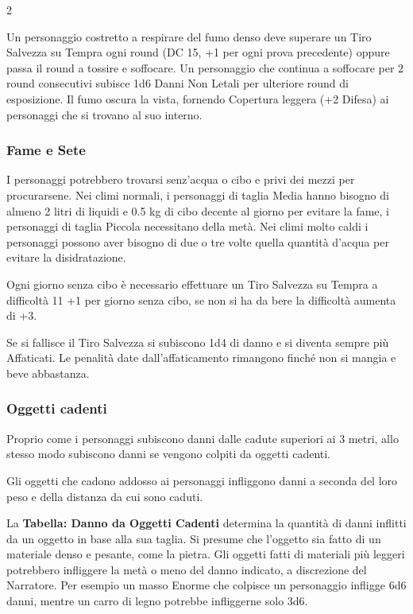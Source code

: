 \begin{multicols}{2}
\label{effetti-del-fumo}

Un personaggio costretto a respirare del fumo denso deve superare un Tiro Salvezza su Tempra ogni round (DC 15, +1 per ogni prova precedente) oppure passa il round a tossire e soffocare. Un personaggio che continua a soffocare per 2 round consecutivi subisce 1d6 Danni Non Letali per ulteriore round di esposizione. Il fumo oscura la vista, fornendo Copertura leggera (+2 Difesa) ai personaggi che si trovano al suo interno.

\subsubsection{Fame e Sete}

\label{fame-e-sete}

I personaggi potrebbero trovarsi senz'acqua o cibo e privi dei mezzi per procurarsene. Nei climi normali, i personaggi di taglia Media hanno bisogno di almeno 2 litri di liquidi e 0.5 kg di cibo decente al giorno per evitare la fame, i personaggi di taglia Piccola necessitano della metà. Nei climi molto caldi i personaggi possono aver bisogno di due o tre volte quella quantità d'acqua per evitare la disidratazione.

Ogni giorno senza cibo è necessario effettuare un Tiro Salvezza su Tempra a difficoltà 11 +1 per giorno senza cibo, se non si ha da bere la difficoltà aumenta di +3.

Se si fallisce il Tiro Salvezza si subiscono 1d4 di danno e si diventa sempre più Affaticati. Le penalità date dall'affaticamento rimangono finché non si mangia e beve abbastanza.

\subsubsection{Oggetti cadenti}

\label{oggetti-cadenti}

Proprio come i personaggi subiscono danni dalle cadute superiori ai 3 metri, allo stesso modo subiscono danni se vengono colpiti da oggetti cadenti.

Gli oggetti che cadono addosso ai personaggi infliggono danni a seconda del loro peso e della distanza da cui sono caduti.

La \textbf{Tabella: Danno da Oggetti Cadenti} determina la quantità di danni inflitti da un oggetto in base alla sua taglia. Si presume che l'oggetto sia fatto di un materiale denso e pesante, come la pietra.
Gli oggetti fatti di materiali più leggeri potrebbero infliggere la metà o meno del danno indicato, a discrezione del Narratore. Per esempio un masso Enorme che colpisce un personaggio infligge 6d6 danni, mentre un carro di legno potrebbe infliggerne solo 3d6.


\end{multicols}
